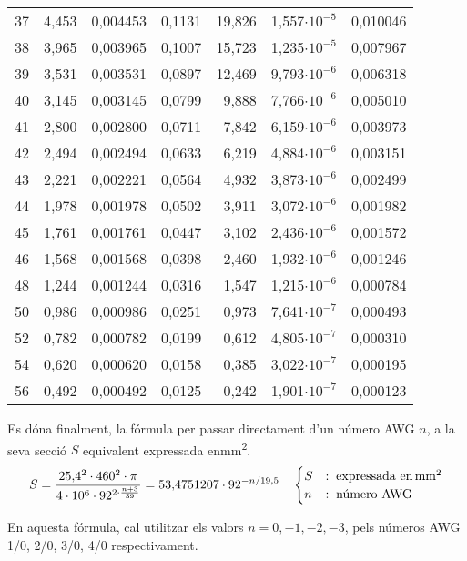 \begin{longtable}{crrrrrr}
37 &      4,453 &   0,004453 &     0,1131 &     19,826 &  1,557$\cdot 10^{-5}$ &   0,010046 \\
38 &      3,965 &   0,003965 &     0,1007 &     15,723 &  1,235$\cdot 10^{-5}$ &   0,007967 \\
39 &      3,531 &   0,003531 &     0,0897 &     12,469 &  9,793$\cdot 10^{-6}$ &   0,006318 \\
40 &      3,145 &   0,003145 &     0,0799 &      9,888 &  7,766$\cdot 10^{-6}$ &   0,005010 \\
41 &      2,800 &   0,002800 &     0,0711 &      7,842 &  6,159$\cdot 10^{-6}$ &   0,003973 \\
42 &      2,494 &   0,002494 &     0,0633 &      6,219 &  4,884$\cdot 10^{-6}$ &   0,003151 \\
43 &      2,221 &   0,002221 &     0,0564 &      4,932 &  3,873$\cdot 10^{-6}$ &   0,002499 \\
44 &      1,978 &   0,001978 &     0,0502 &      3,911 &  3,072$\cdot 10^{-6}$ &   0,001982 \\
45 &      1,761 &   0,001761 &     0,0447 &      3,102 &  2,436$\cdot 10^{-6}$ &   0,001572 \\
46 &      1,568 &   0,001568 &     0,0398 &      2,460 &  1,932$\cdot 10^{-6}$ &   0,001246 \\
48 &      1,244 &   0,001244 &     0,0316 &      1,547 &  1,215$\cdot 10^{-6}$ &   0,000784 \\
50 &      0,986 &   0,000986 &     0,0251 &      0,973 &  7,641$\cdot 10^{-7}$ &   0,000493 \\
52 &      0,782 &   0,000782 &     0,0199 &      0,612 &  4,805$\cdot 10^{-7}$ &   0,000310
\\
54 &      0,620 &   0,000620 &     0,0158 &      0,385 &  3,022$\cdot 10^{-7}$ &   0,000195
\\
56 &      0,492 &   0,000492 &     0,0125 &      0,242 &  1,901$\cdot 10^{-7}$ &   0,000123
\\
\bottomrule[1pt]
\end{longtable}

 Es d\'{o}na finalment, la f\'{o}rmula per passar directament d'un n\'{u}mero AWG $n$, a la seva secci\'{o} $S$ equivalent expressada en\unit{mm^2}.
\begin{equation}
   S = \frac{25{,}4^2 \cdot 460^2 \cdot \pi}{4 \cdot 10^6 \cdot 92^{2\cdot\frac{n+3}{39}}} =
   53{,}4751207 \cdot 92^{-n/19{,}5} \quad
\begin{cases}
   S &:\; \text{expressada en\ensuremath{\mathrm{\,mm^2}}} \\
   n &:\; \text{n\'{u}mero AWG}
\end{cases}
\end{equation}

En aquesta f\'{o}rmula, cal utilitzar els valors $n = 0, -1, -2, -3$,  pels n\'{u}meros AWG 1/0,
2/0, 3/0, 4/0 respectivament.

